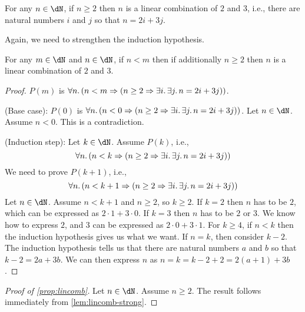\documentclass{amsart}
\begin{document}
\begin{prop}\label{prop:lincomb}
  For any $n \in \dN$, if $n \geq 2$ then $n$ is a linear combination of $2$ and $3$, i.e., there are natural numbers $i$ and $j$ so that $n = 2i + 3j$.
\end{prop}

Again, we need to strengthen the induction hypothesis.

\begin{lem}\label{lem:lincomb-strong}
  For any $m \in \dN$ and $n \in \dN$, if $n < m$ then if additionally $n \geq 2$ then $n$ is a linear combination of $2$ and $3$.
\end{lem}
\begin{proof}
  $P(m)$ is $\forall n.\,(n < m \Rightarrow (n \geq 2 \Rightarrow \exists i.\,\exists j.\,n = 2i + 3j))$.

  (Base case): $P(0)$ is $\forall n.\,(n < 0 \Rightarrow (n \geq 2 \Rightarrow \exists i.\,\exists j.\,n = 2i + 3j))$.
  Let $n \in \dN$.
  Assume $n < 0$.
  This is a contradiction.

  (Induction step): Let $k \in \dN$.
  Assume $P(k)$, i.e.,
  \[
    \forall n.\,(n < k \Rightarrow (n \geq 2 \Rightarrow \exists i.\,\exists j.\,n = 2i + 3j))
  \]
  We need to prove $P(k+1)$, i.e.,
  \[
    \forall n.\,(n < k + 1 \Rightarrow (n \geq 2 \Rightarrow \exists i.\,\exists j.\,n = 2i + 3j))
  \]
  Let $n \in \dN$.
  Assume $n < k + 1$ and $n \geq 2$, so $k \geq 2$.
  If $k = 2$ then $n$ has to be $2$, which can be expressed as $2 \cdot 1 + 3 \cdot 0$.
  If $k = 3$ then $n$ has to be $2$ or $3$.
  We know how to express $2$, and $3$ can be expressed as $2 \cdot 0 + 3 \cdot 1$.
  For $k \geq 4$, if $n < k$ then the induction hypothesis gives us what we want.
  If $n = k$, then consider $k - 2$.
  The induction hypothesis tells us that there are natural numbers $a$ and $b$ so that $k - 2 = 2a + 3b$.
  We can then express $n$ as $n = k = k - 2 + 2 = 2(a + 1) + 3b$.
\end{proof}

\begin{proof}[Proof of \cref{prop:lincomb}]
  Let $n \in \dN$.
  Assume $n \geq 2$.
  The result follows immediately from \cref{lem:lincomb-strong}.
\end{proof}
\end{document}
